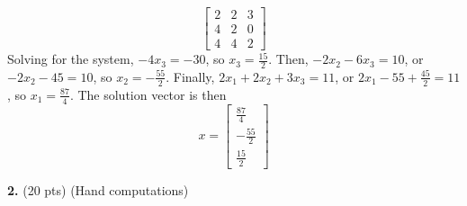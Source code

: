 \documentclass[10pt,letterpaper]{article}
\begin{document}
\begin{enumerate}
$$\begin{bmatrix}
2 & 2 & 3 \\
4 & 2 & 0 \\
4 & 4 & 2 
\end{bmatrix}$$
Solving for the system, $-4x_{3} = -30$, so $x_{3} = \frac{15}{2}$. Then, $-2x_{2} - 6x_{3} = 10$, or $-2x_{2} - 45 = 10$, so $x_{2} = -\frac{55}{2}$. Finally, $2x_{1} + 2x_{2} + 3x_{3} = 11$, or $2x_{1} - 55 + \frac{45}{2} = 11$, so $x_{1} = \frac{87}{4}$. The solution vector is then
$$x = \begin{bmatrix}
\frac{87}{4} \\
-\frac{55}{2} \\
\frac{15}{2}
\end{bmatrix}$$
\color{black}

\end{enumerate}

\noindent\textbf{2. }(20 pts) (Hand computations)
\end{document}
